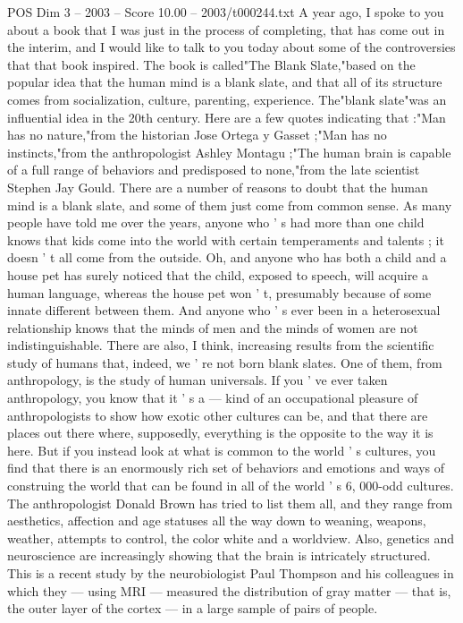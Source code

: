 \begin{textsample}{POS Dim 3 – 2003 – Score 10.00 – 2003/t000244.txt}  \label{ex:f3_pos_072}
A year ago, I spoke to you about a book that I was just in the process of completing, that has come out in the interim, and I would like to talk to you today about some of the controversies that that book inspired.
The book is called"The Blank Slate,"based on the popular idea that the human mind is a blank slate, and that all of its structure comes from socialization, culture, parenting, experience.
The"blank slate"was an influential idea in the 20th century.
Here are a few quotes indicating that :"Man has no nature,"from the historian Jose Ortega y Gasset ;"Man has no instincts,"from the anthropologist Ashley Montagu ;"The human brain is capable of a full range of behaviors and predisposed to none,"from the late scientist Stephen Jay Gould.
There are a number of reasons to doubt that the human mind is a blank slate, and some of them just come from common sense.
As many people have told me over the years, anyone who ' s had more than one child knows that kids come into the world with certain temperaments and talents ; it doesn ' t all come from the outside.
Oh, and anyone who has both a child and a house pet has surely noticed that the child, exposed to speech, will acquire a human language, whereas the house pet won ' t, presumably because of some innate different between them.
And anyone who ' s ever been in a heterosexual relationship knows that the minds of men and the minds of women are not indistinguishable.
There are also, I think, increasing results from the scientific study of humans that, indeed, we ' re not born blank slates.
One of them, from anthropology, is the study of human universals.
If you ' ve ever taken anthropology, you know that it ' s a — kind of an occupational pleasure of anthropologists to show how exotic other cultures can be, and that there are places out there where, supposedly, everything is the opposite to the way it is here.
But if you instead look at what is common to the world ' s cultures, you find that there is an enormously rich set of behaviors and emotions and ways of construing the world that can be found in all of the world ' s 6, 000-odd cultures.
The anthropologist Donald Brown has tried to list them all, and they range from aesthetics, affection and age statuses all the way down to weaning, weapons, weather, attempts to control, the color white and a worldview.
Also, genetics and neuroscience are increasingly showing that the brain is intricately structured.
This is a recent study by the neurobiologist Paul Thompson and his colleagues in which they — using MRI — measured the distribution of gray matter — that is, the outer layer of the cortex — in a large sample of pairs of people.

\end{textsample}
